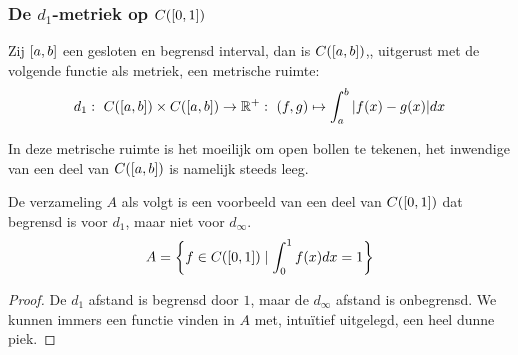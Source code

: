 \documentclass[main.tex]{subfiles}
\begin{document}
\subsubsection{De $d_1$-metriek op $C(\interval{0}{1})$}
\label{sec:de-d_1-metriek}

\begin{vb}
  Zij $\interval{a}{b}$ een gesloten en begrensd interval, dan is $C(\interval{a}{b})$,, uitgerust met de volgende functie als metriek, een metrische ruimte:
  \[ d_{1}:\ C(\interval{a}{b})\times C(\interval{a}{b}) \rightarrow \mathbb{R}^{+}:\ (f,g) \mapsto \int_{a}^{b}|f(x)-g(x)|dx \]
\end{vb}

\begin{opm}
  In deze metrische ruimte is het moeilijk om open bollen te tekenen, het inwendige van een deel van $C(\interval{a}{b})$ is namelijk steeds leeg.
\end{opm}

\begin{vb}
  De verzameling $A$ als volgt is een voorbeeld van een deel van $C(\interval{0}{1})$ dat begrensd is voor $d_{1}$, maar niet voor $d_{\infty}$.
  \[ A = \left\{ f \in C(\interval{0}{1}) \mid \int_{0}^{1}f(x)dx = 1 \right\}\]

  \begin{proof}
    De $d_{1}$ afstand is begrensd door $1$, maar de $d_{\infty}$ afstand is onbegrensd.
    We kunnen immers een functie vinden in $A$ met, intu\"itief uitgelegd, een heel dunne piek.
  \end{proof}
\end{vb}
\end{document}
